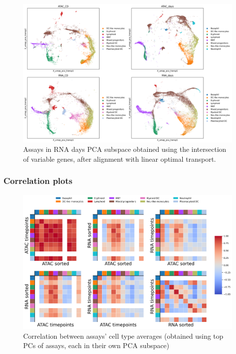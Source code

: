 \documentclass[a4paper]{article}
\begin{document}
\begin{figure}[!htb]
  \centering
  \includegraphics[width=\textwidth]{../figures/hematopoiesis/assays_RNA_days_subspace_aligned_Intersection_of_variable_genes_leiden_identity_simple2.png}
  \caption{Assays in RNA days PCA subspace obtained using the intersection of variable genes, after alignment with linear optimal transport.}
\end{figure}

\FloatBarrier
\subsubsection{Correlation plots}

\begin{figure}[!htb]
  \centering
  \includegraphics[width=\textwidth]{../figures/hematopoiesis/assays_X_pca_target_leiden_identity_simple2.png}
  \caption{Correlation between assays' cell type averages (obtained using top PCs of assays, each in their own PCA subspace)}
\end{figure}
\end{document}

